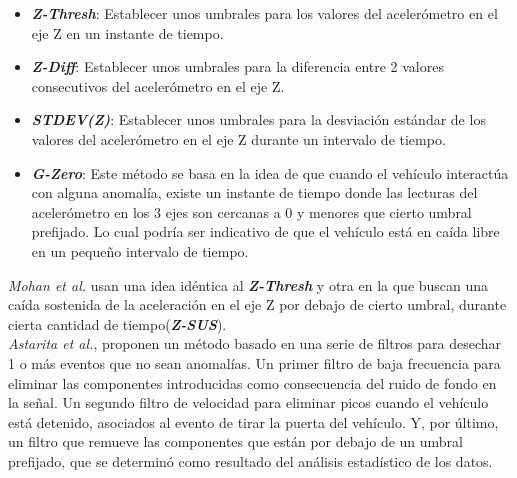 		\begin{itemize}
			\item  \emph{\textbf {Z-Thresh}}: Establecer unos umbrales para los valores del acelerómetro en el eje Z en un instante de tiempo.\\
			\item \emph{\textbf {Z-Diff}}: Establecer unos umbrales para la diferencia entre 2 valores consecutivos del acelerómetro en el eje Z.\\
			\item \emph{\textbf {STDEV(Z)}}: Establecer unos umbrales para la desviación estándar de los valores del acelerómetro en
				el eje Z durante un intervalo de tiempo.\\ 
			\item \emph{\textbf {G-Zero}}: Este método se basa en la idea de que cuando el vehículo interactúa con alguna anomalía, existe un
				instante de tiempo donde las lecturas del acelerómetro en los 3 ejes son cercanas a 0 y menores que cierto umbral prefijado. Lo 
				cual podría ser indicativo de que el vehículo está en caída libre en un pequeño intervalo de tiempo.
		\end{itemize}

		\emph{Mohan et al.} usan una idea idéntica al \emph{\textbf{Z-Thresh}} y otra en la que buscan
		una caída sostenida de la aceleración en el eje Z por debajo de cierto umbral, durante cierta cantidad de tiempo(\emph{\textbf{Z-SUS}}).\\

		\emph{Astarita et al.}, proponen un método basado en una serie de filtros para desechar 1 o más eventos que
		no sean anomalías. Un primer filtro de baja frecuencia para eliminar las componentes introducidas como consecuencia del ruido de fondo en la señal.
		Un segundo filtro de velocidad para eliminar picos cuando el vehículo está detenido, asociados al evento de tirar la puerta del vehículo. Y, por 
		último, un filtro que remueve las componentes que están por debajo de un umbral prefijado, que se determinó como resultado del análisis estadístico
		de los datos. 


